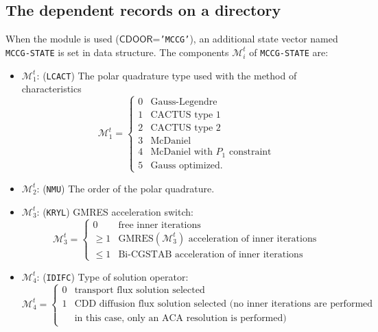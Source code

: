 \subsection{The  dependent records on a  directory}\label{sect:mccgtrackingdir}

When the  module is used ($\mathsf{CDOOR}$={\tt 'MCCG'}), an additional state vector
named {\tt MCCG-STATE} is set in  data structure. The components $\mathcal{M}^{t}_{i}$
of {\tt MCCG-STATE} are:

\begin{itemize}

\item $\mathcal{M}^{t}_{1}$: ({\tt LCACT}) The polar quadrature type used with the method of characteristics 
\begin{displaymath}
\mathcal{M}^{t}_{1} = \left\{
\begin{array}{rl}
 0 & \textrm{Gauss-Legendre} \\
 1 & \textrm{CACTUS type 1} \\
 2 & \textrm{CACTUS type 2} \\
 3 & \textrm{McDaniel} \\
 4 & \textrm{McDaniel with $P_1$ constraint} \\
 5 & \textrm{Gauss optimized.}
\end{array} \right.
\end{displaymath}

\item $\mathcal{M}^{t}_{2}$: ({\tt NMU}) The order of the polar quadrature.

\item $\mathcal{M}^{t}_{3}$: ({\tt KRYL}) GMRES acceleration switch:
\begin{displaymath}
\mathcal{M}^{t}_{3} = \left\{
\begin{array}{rl}
 0 & \textrm{free inner iterations} \\
 \ge 1 & \textrm{GMRES$(\mathcal{M}^{t}_{3})$ acceleration of inner iterations} \\
 \le 1 & \textrm{Bi-CGSTAB acceleration of inner iterations}
\end{array} \right.
\end{displaymath}

\item $\mathcal{M}^{t}_{4}$: ({\tt IDIFC}) Type of solution operator:
\begin{displaymath}
\mathcal{M}^{t}_{4} = \left\{
\begin{array}{rl}
 0 & \textrm{transport flux solution selected} \\
 1 & \textrm{CDD diffusion flux solution selected (no inner iterations are performed} \\
   & \textrm{in this case, only an ACA resolution is performed)}
\end{array} \right.
\end{displaymath}


\end{itemize}
